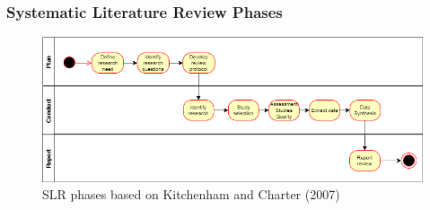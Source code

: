 \documentclass[10pt]{beamer}
\begin{document}
\begin{frame}
	\frametitle{Systematic Literature Review Phases}
	\begin{figure}
		\includegraphics[scale=0.5]{../img/slr_phases.png}
		\caption{SLR phases based on Kitchenham and Charter (2007)}
		\label{figure1}
	\end{figure}
\end{frame}
\end{document}
